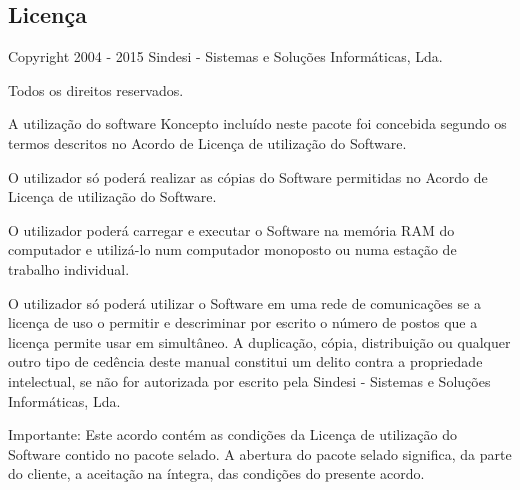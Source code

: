\subsection{Licença}

Copyright 2004 - 2015 Sindesi - Sistemas e Soluções Informáticas, Lda.

Todos os direitos reservados.

A utilização do software Koncepto incluído neste pacote foi concebida segundo os termos
descritos no Acordo de Licença de utilização do Software.

O utilizador só poderá realizar as cópias do Software permitidas no Acordo de Licença de
utilização do Software.

O utilizador poderá carregar e executar o Software na memória RAM do computador e utilizá-lo
num computador monoposto ou numa estação de trabalho individual.

O utilizador só poderá utilizar o Software em uma rede de comunicações se a licença de uso o
permitir e descriminar por escrito o número de postos que a licença permite usar em simultâneo.
A duplicação, cópia, distribuição ou qualquer outro tipo de cedência deste manual constitui um
delito contra a propriedade intelectual, se não for autorizada por escrito pela Sindesi - 
Sistemas e Soluções Informáticas, Lda.

Importante: Este acordo contém as condições da Licença de utilização do Software contido no
pacote selado. A abertura do pacote selado significa, da parte do cliente, a aceitação na íntegra,
das condições do presente acordo.
